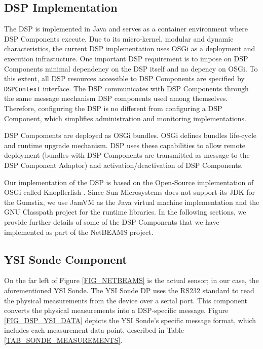 \documentclass[conference]{IEEEtran}
\begin{document}
\subsection{DSP Implementation}

The DSP is implemented in Java and serves as a container environment where 
DSP Components execute. Due to its micro-kernel, modular and dynamic characteristics, 
the current DSP implementation uses OSGi \cite{osgi} as a deployment and execution 
infrastucture. One important DSP requirement is to impose on DSP Components minimal 
dependency on the DSP itself and no depency on OSGi. To this extent, all DSP resources
accessible to DSP Components are specified by \texttt{DSPContext} interface.
The DSP communicates with DSP Components through the same message mechanism DSP components
used among themselves. Therefore, configuring the DSP is no different from configuring
a DSP Component, which simplifies administration and monitoring implementations.

DSP Compoments are deployed as OSGi bundles. OSGi defines bundles life-cycle and
runtime upgrade mechanism. DSP uses these capabilities to allow remote deployment 
(bundles with DSP Components are transmitted as message to the DSP Component Adaptor) 
and activation/deactivation of DSP Components. 

Our implementation of the DSP is based on the Open-Source
implementation of OSGi called Knopflerfish \cite{knopflerfish01}.
Since Sun Microsystems does not support its JDK for the Gumstix, we
use JamVM \cite{jamvm01} as the Java virtual machine implementation
and the GNU Classpath \cite{classpath01} project for the runtime libraries. In
the following sections, we provide further details of some of the DSP
Components that we have implemented as part of the NetBEAMS project.

\subsection{YSI Sonde Component}

On the far left of Figure \ref{FIG_NETBEAMS} is the actual sensor; in
our case, the aforementioned YSI Sonde. The YSI Sonde DP 
uses the RS232 standard to read the physical measurements from the
device over a serial port.  This component converts the physical
measurements into a DSP-specific message. Figure
\ref{FIG_DSP_YSI_DATA} depicts the YSI Sonde's specific message format, 
which includes each measurement data point, described in Table
\ref{TAB_SONDE_MEASUREMENTS}.
\end{document}
